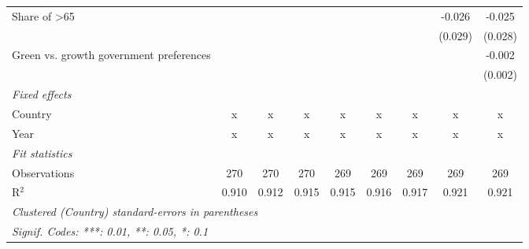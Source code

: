 \begin{table}[htbp]
\begin{tabular}{lcccccccc}
      Share of >65                            &         &         &         &         &         &         & -0.026  & -0.025\\   
                                              &         &         &         &         &         &         & (0.029) & (0.028)\\   
      Green vs. growth government preferences &         &         &         &         &         &         &         & -0.002\\   
                                              &         &         &         &         &         &         &         & (0.002)\\   
      \emph{Fixed effects}\\
      Country                                 & x       & x       & x       & x       & x       & x       & x       & x\\  
      Year                                    & x       & x       & x       & x       & x       & x       & x       & x\\  
      \midrule \emph{Fit statistics}\\
      Observations                            & 270     & 270     & 270     & 269     & 269     & 269     & 269     & 269\\  
      R$^2$                                   & 0.910   & 0.912   & 0.915   & 0.915   & 0.916   & 0.917   & 0.921   & 0.921\\  
      \midrule
      \multicolumn{9}{l}{\emph{Clustered (Country) standard-errors in parentheses}}\\
      \multicolumn{9}{l}{\emph{Signif. Codes: ***: 0.01, **: 0.05, *: 0.1}}\\
   \end{tabular}
\end{table}


